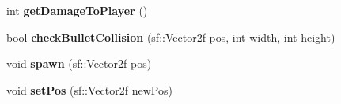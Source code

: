 \begin{DoxyCompactItemize}
\item 
\mbox{\label{class_predator___ship_a92d3654825e098d7e134133f7356609d}} 
int {\bfseries get\+Damage\+To\+Player} ()
\item 
\mbox{\label{class_predator___ship_adac9b29921a21f03dbb1b3b55efb0f9b}} 
bool {\bfseries check\+Bullet\+Collision} (sf\+::\+Vector2f pos, int width, int height)
\item 
\mbox{\label{class_predator___ship_ac252c8ede68457e853aa6b8c4a8e898c}} 
void {\bfseries spawn} (sf\+::\+Vector2f pos)
\item 
\mbox{\label{class_predator___ship_aad3f7d20092db3baff96590b51a7b351}} 
void {\bfseries set\+Pos} (sf\+::\+Vector2f new\+Pos)
\end{DoxyCompactItemize}

